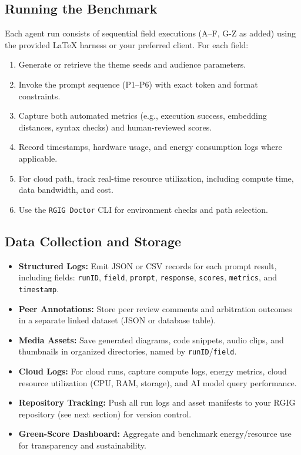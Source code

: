 \documentclass[11pt]{article}
\begin{document}
\subsection*{Running the Benchmark}
Each agent run consists of sequential field executions (A–F, G-Z as added) using the provided LaTeX harness or your preferred client. For each field:
\begin{enumerate}
  \item Generate or retrieve the theme seeds and audience parameters.
  \item Invoke the prompt sequence (P1–P6) with exact token and format constraints.
  \item Capture both automated metrics (e.g., execution success, embedding distances, syntax checks) and human-reviewed scores.
  \item Record timestamps, hardware usage, and energy consumption logs where applicable.
  \item For cloud path, track real-time resource utilization, including compute time, data bandwidth, and cost.
  \item Use the \texttt{RGIG Doctor} CLI for environment checks and path selection.
\end{enumerate}

\subsection*{Data Collection and Storage}
\begin{itemize}
  \item \textbf{Structured Logs:} Emit JSON or CSV records for each prompt result, including fields: 
    \texttt{runID}, \texttt{field}, \texttt{prompt}, \texttt{response}, \texttt{scores}, \texttt{metrics}, and \texttt{timestamp}.
  \item \textbf{Peer Annotations:} Store peer review comments and arbitration outcomes in a separate linked dataset (JSON or database table).
  \item \textbf{Media Assets:} Save generated diagrams, code snippets, audio clips, and thumbnails in organized directories, named by \texttt{runID}/\texttt{field}.
  \item \textbf{Cloud Logs:} For cloud runs, capture compute logs, energy metrics, cloud resource utilization (CPU, RAM, storage), and AI model query performance.
  \item \textbf{Repository Tracking:} Push all run logs and asset manifests to your RGIG repository (see next section) for version control.
  \item \textbf{Green-Score Dashboard:} Aggregate and benchmark energy/resource use for transparency and sustainability.
\end{itemize}
\end{document}
